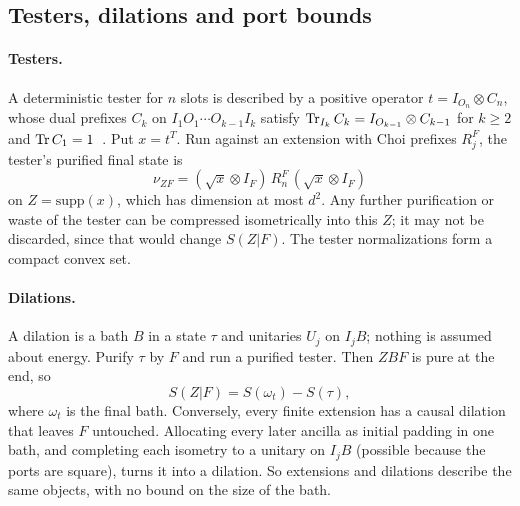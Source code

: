 \subsection{Testers, dilations and port bounds}\label{ar:app:testers}

\paragraph{Testers.} A deterministic tester for $n$ slots is described by a positive operator $t=I_{O_n}\otimes C_n$, whose dual prefixes $C_k$ on $I_1O_1\cdots O_{k-1}I_k$ satisfy $\operatorname{Tr}_{I_k}C_k=I_{O_{k-1}}\otimes C_{k-1}$ for $k\ge2$ and $\operatorname{Tr} C_1=1$~\cite{Chiribella08,GutoskiWatrous07}. Put $x=t^T$. Run against an extension with Choi prefixes $R_j^F$, the tester's purified final state is
\begin{equation}\label{ar:eq:testerstate}
\nu_{ZF}=(\sqrt x\otimes I_F)\,R_n^F\,(\sqrt x\otimes I_F)
\end{equation}
on $Z=\mathrm{supp}(x)$, which has dimension at most $d^2$. Any further purification or waste of the tester can be compressed isometrically into this $Z$; it may not be discarded, since that would change $S(Z|F)$. The tester normalizations form a compact convex set.

\paragraph{Dilations.} A dilation is a bath $B$ in a state $\tau$ and unitaries $U_j$ on $I_jB$; nothing is assumed about energy. Purify $\tau$ by $F$ and run a purified tester. Then $ZBF$ is pure at the end, so
\[
S(Z|F)=S(\omega_t)-S(\tau),
\]
where $\omega_t$ is the final bath. Conversely, every finite extension has a causal dilation that leaves $F$ untouched. Allocating every later ancilla as initial padding in one bath, and completing each isometry to a unitary on $I_jB$ (possible because the ports are square), turns it into a dilation. So extensions and dilations describe the same objects, with no bound on the size of the bath.

